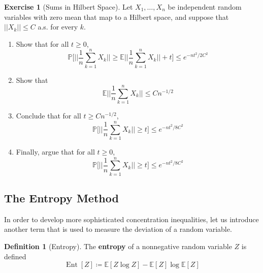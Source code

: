 \documentclass{article}
\DeclareMathOperator{\Ent}{Ent}
\theoremstyle{definition}
\newtheorem{exercise}{Exercise}[section]
\theoremstyle{remark}
\theoremstyle{definition}
\newtheorem{definition}{Definition}[section]
\begin{document}
\begin{exercise}[Sums in Hilbert Space]
Let $X_1, \ldots, X_n$ be independent random variables with zero mean that map to a Hilbert space, and suppose that $||X_k|| \leq C$ a.s. for every $k$. 
\begin{enumerate}
    \item Show that for all $t \geq 0$, 
    \[\mathbb{P} \bigg[ \bigg| \bigg| \frac{1}{n} \sum_{k=1}^n X_k \bigg| \bigg| \geq \mathbb{E} \bigg| \bigg| \frac{1}{n} \sum_{k=1}^n X_k \bigg| \bigg| + t \bigg] \leq e^{-nt^2 / 2C^2} \]
    
    \item Show that 
    \[\mathbb{E} \bigg| \bigg| \frac{1}{n} \sum_{k=1}^n X_k \bigg| \bigg| \leq C n^{-1/2}\]
    
    \item Conclude that for all $t \geq C n^{-1/2}$, 
    \[\mathbb{P} \bigg[ \bigg| \bigg| \frac{1}{n} \sum_{k=1}^n X_k \bigg| \bigg| \geq t \bigg] \leq e^{-nt^2 / 8C^2}\]
    
    \item Finally, argue that for all $t \geq 0$, 
    \[\mathbb{P} \bigg[ \bigg| \bigg| \frac{1}{n} \sum_{k=1}^n X_k \bigg| \bigg| \geq t \bigg] \leq e^{-nt^2 / 8C^2}\]
\end{enumerate}
\end{exercise}

\subsection{The Entropy Method}

In order to develop more sophisticated concentration inequalities, let us introduce another term that is used to measure the deviation of a random variable. 

\begin{definition}[Entropy]
The \textbf{entropy} of a nonnegative random variable $Z$ is defined 
\[\Ent[Z] \coloneqq \mathbb{E}[Z \log Z] - \mathbb{E}[Z] \log \mathbb{E}[Z]\]
\end{definition}
\end{document}
